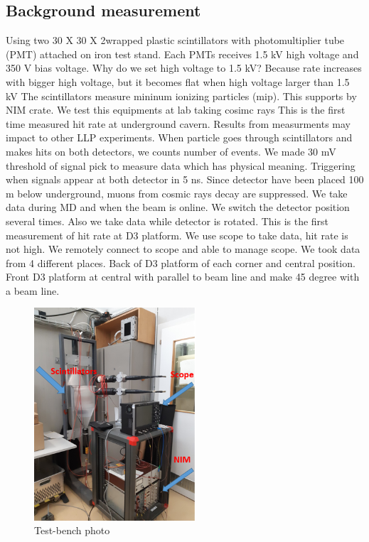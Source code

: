 \subsection{Background measurement}

Using two 30 X 30 X 2\cm wrapped plastic scintillators with photomultiplier tube (PMT) attached on iron test stand. 
Each PMTs receives 1.5 kV high voltage and 350 V bias voltage. 
Why do we set high voltage to 1.5 kV? Because rate increases with bigger high voltage, but it becomes flat when high voltage larger than 1.5 kV
The scintillators measure mininum ionizing particles (mip).
This supports by NIM crate.
We test this equipments at lab taking cosimc rays
This is the first time measured hit rate at underground cavern.
Results from measurments may impact to other LLP experiments.
When particle goes through scintillators and makes hits on both detectors, we counts number of events. 
We made 30 mV threshold of signal pick to measure data which has physical meaning. 
Triggering when signals appear at both detector in 5 ns. 
Since detector have been placed 100 m below underground, muons from cosmic rays decay are suppressed. 
We take data during MD and when the beam is online. 
We switch the detector position several times. Also we take data while detector is rotated. 
This is the first measurement of hit rate at D3 platform. 
We use scope to take data, hit rate is not high. 
We remotely connect to scope and able to manage scope.
We took data from 4 different places. 
Back of D3 platform of each corner and central position.
Front D3 platform at central with parallel to beam line and make 45 degree with a beam line.

\begin{figure}[h]
\centering
    \includegraphics[width=6cm]{figs/INT/Tools.png} 
\caption{ 
    Test-bench photo
}
\end{figure}

